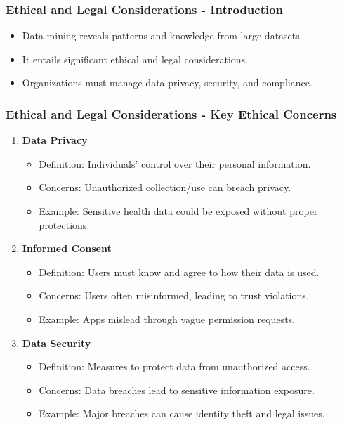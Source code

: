 \documentclass{beamer}
\begin{document}
\begin{frame}[fragile]
    \frametitle{Ethical and Legal Considerations - Introduction}
    \begin{itemize}
        \item Data mining reveals patterns and knowledge from large datasets.
        \item It entails significant ethical and legal considerations.
        \item Organizations must manage data privacy, security, and compliance.
    \end{itemize}
\end{frame}

\begin{frame}[fragile]
    \frametitle{Ethical and Legal Considerations - Key Ethical Concerns}
    \begin{enumerate}
        \item \textbf{Data Privacy}
        \begin{itemize}
            \item Definition: Individuals' control over their personal information.
            \item Concerns: Unauthorized collection/use can breach privacy.
            \item Example: Sensitive health data could be exposed without proper protections.
        \end{itemize}
        
        \item \textbf{Informed Consent}
        \begin{itemize}
            \item Definition: Users must know and agree to how their data is used.
            \item Concerns: Users often misinformed, leading to trust violations.
            \item Example: Apps mislead through vague permission requests.
        \end{itemize}
        
        \item \textbf{Data Security}
        \begin{itemize}
            \item Definition: Measures to protect data from unauthorized access.
            \item Concerns: Data breaches lead to sensitive information exposure.
            \item Example: Major breaches can cause identity theft and legal issues.
        \end{itemize}
    \end{enumerate}
\end{frame}
\end{document}
